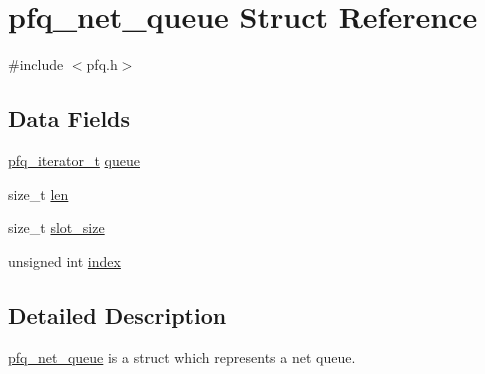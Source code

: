 \hypertarget{structpfq__net__queue}{\section{pfq\+\_\+net\+\_\+queue Struct Reference}
\label{structpfq__net__queue}
}


{\ttfamily \#include $<$pfq.\+h$>$}

\subsection*{Data Fields}
\begin{DoxyCompactItemize}
\item 
\hyperlink{pfq_8h_a6e330e8e393bb4b5ecefdd5bf47a6f57}{pfq\+\_\+iterator\+\_\+t} \hyperlink{structpfq__net__queue_a4858e72d7edbe741638986afc0ba9282}{queue}
\item 
size\+\_\+t \hyperlink{structpfq__net__queue_a4b511d3c1dbd8d9ed36008500bd44350}{len}
\item 
size\+\_\+t \hyperlink{structpfq__net__queue_ad15e389ac5a91523cccb571c094d3f4e}{slot\+\_\+size}
\item 
unsigned int \hyperlink{structpfq__net__queue_af66bc8d91f38d0d6c218c9bae8081185}{index}
\end{DoxyCompactItemize}


\subsection{Detailed Description}
\hyperlink{structpfq__net__queue}{pfq\+\_\+net\+\_\+queue} is a struct which represents a net queue. 

